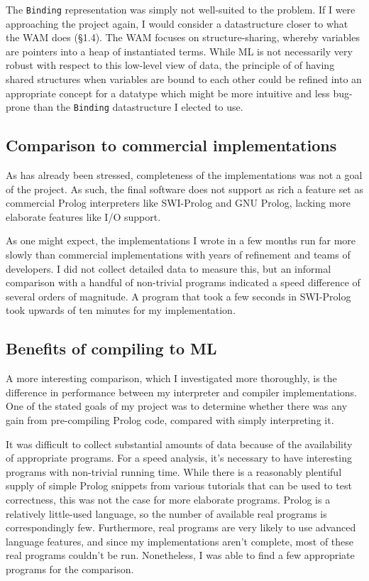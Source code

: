 \documentclass[12pt]{article}
\begin{document}
The \verb|Binding| representation was simply not well-suited to the problem. 
If I were approaching the project again, I would consider a datastructure closer to what the WAM does (\S1.4). 
The WAM focuses on structure-sharing, whereby variables are pointers into a heap of instantiated terms. 
While ML is not necessarily very robust with respect to this low-level view of data, the principle of of having shared structures when variables are bound to each other could be refined into an appropriate concept for a datatype which might be more intuitive and less bug-prone than the \verb|Binding| datastructure I elected to use.

\subsection{Comparison to commercial implementations}

As has already been stressed, completeness of the implementations was not a goal of the project. As such, the final software does not support as rich a feature set as commercial Prolog interpreters like SWI-Prolog and GNU Prolog, lacking more elaborate features like I/O support.

As one might expect, the implementations I wrote in a few months run far more slowly than commercial implementations with years of refinement and teams of developers. I did not collect detailed data to measure this, but an informal comparison with a handful of non-trivial programs indicated a speed difference of several orders of magnitude. A program that took a few seconds in SWI-Prolog took upwards of ten minutes for my implementation.

\subsection{Benefits of compiling to ML}

A more interesting comparison, which I investigated more thoroughly, is the difference in performance between my interpreter and compiler implementations. One of the stated goals of my project was to determine whether there was any gain from pre-compiling Prolog code, compared with simply interpreting it.

It was difficult to collect substantial amounts of data because of the availability of appropriate programs. For a speed analysis, it's necessary to have interesting programs with non-trivial running time. While there is a reasonably plentiful supply of simple Prolog snippets from various tutorials that can be used to test correctness, this was not the case for more elaborate programs. Prolog is a relatively little-used language, so the number of available real programs is correspondingly few. Furthermore, real programs are very likely to use advanced language features, and since my implementations aren't complete, most of these real programs couldn't be run. Nonetheless, I was able to find a few appropriate programs for the comparison.
\end{document}
